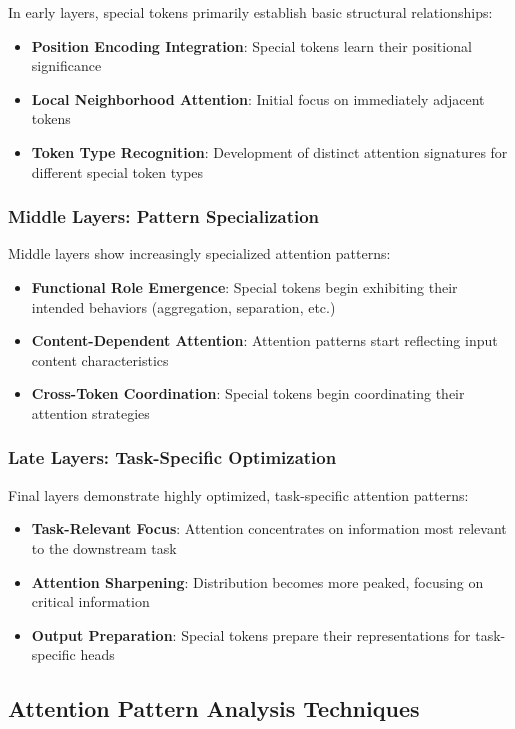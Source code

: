 In early layers, special tokens primarily establish basic structural relationships:
\begin{itemize}
\item \textbf{Position Encoding Integration}: Special tokens learn their positional significance
\item \textbf{Local Neighborhood Attention}: Initial focus on immediately adjacent tokens
\item \textbf{Token Type Recognition}: Development of distinct attention signatures for different special token types
\end{itemize}

\subsubsection{Middle Layers: Pattern Specialization}

Middle layers show increasingly specialized attention patterns:
\begin{itemize}
\item \textbf{Functional Role Emergence}: Special tokens begin exhibiting their intended behaviors (aggregation, separation, etc.)
\item \textbf{Content-Dependent Attention}: Attention patterns start reflecting input content characteristics
\item \textbf{Cross-Token Coordination}: Special tokens begin coordinating their attention strategies
\end{itemize}

\subsubsection{Late Layers: Task-Specific Optimization}

Final layers demonstrate highly optimized, task-specific attention patterns:
\begin{itemize}
\item \textbf{Task-Relevant Focus}: Attention concentrates on information most relevant to the downstream task
\item \textbf{Attention Sharpening}: Distribution becomes more peaked, focusing on critical information
\item \textbf{Output Preparation}: Special tokens prepare their representations for task-specific heads
\end{itemize}

\subsection{Attention Pattern Analysis Techniques}

